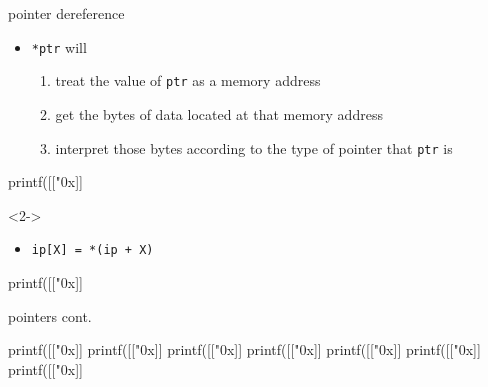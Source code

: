 \documentclass[10pt,t]{beamer}
\begin{document}
  \begin{frame}[fragile]{pointer dereference}
    \begin{itemize}
      \item \texttt{*ptr} will
        \begin{enumerate}
          \item treat the value of \texttt{ptr} as a memory address
          \item get the bytes of data located at that memory address
          \item interpret those bytes according to the type of pointer that
            \texttt{ptr} is
        \end{enumerate}
    \end{itemize}
    \begin{codeblock}
    printf([["0x]]%
    \end{codeblock}

    \begin{onlyenv}<2->
      \begin{itemize}
        \item \texttt{ip[X] = *(ip + X)}
      \end{itemize}
      \begin{codeblock}
    printf([["0x]]%
      \end{codeblock}
    \end{onlyenv}

  \end{frame}

  \begin{frame}[fragile]{pointers cont.}
    \begin{codeblock}
    printf([["0x]]%
    printf([["0x]]%
    printf([["0x]]%
    printf([["0x]]%
    printf([["0x]]%
    printf([["0x]]%
    printf([["0x]]%
    \end{codeblock}
  \end{frame}
\end{document}
